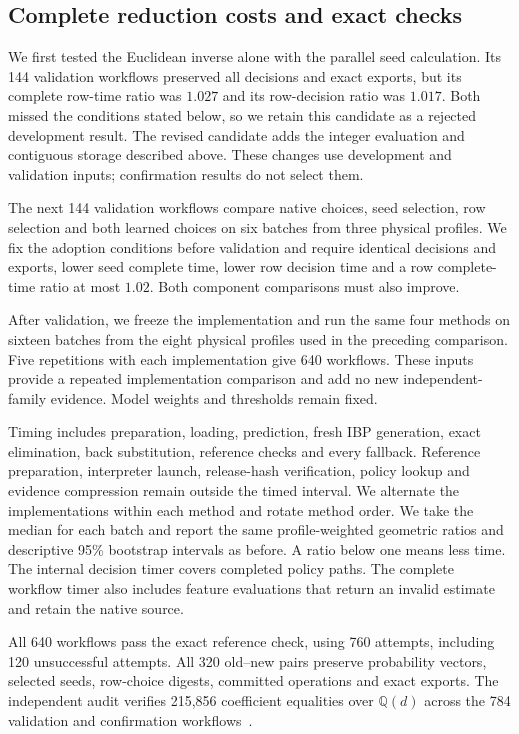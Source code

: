 \subsection{Complete reduction costs and exact checks}
We first tested the Euclidean inverse alone with the parallel seed
calculation. Its 144 validation workflows preserved all decisions and exact
exports, but its complete row-time ratio was $1.027$ and its row-decision
ratio was $1.017$. Both missed the conditions stated below, so we retain
this candidate as a rejected development result. The revised candidate
adds the integer evaluation and contiguous storage described above.
These changes use development and validation inputs; confirmation results
do not select them.

The next 144 validation workflows compare native choices, seed selection,
row selection and both learned choices on six batches from three physical
profiles. We fix the adoption conditions before validation and require
identical decisions and exports, lower seed complete time, lower row
decision time and a row complete-time ratio at most $1.02$.
Both component comparisons must also improve.

After validation, we freeze the implementation and run the same four methods
on sixteen batches from the eight physical profiles used in the preceding
comparison. Five repetitions with each implementation give 640 workflows.
These inputs provide a repeated implementation comparison and add no new
independent-family evidence. Model weights and thresholds remain fixed.

Timing includes preparation, loading, prediction, fresh IBP generation,
exact elimination, back substitution, reference checks and every fallback.
Reference preparation, interpreter launch, release-hash verification,
policy lookup and evidence
compression remain outside the timed interval. We alternate the implementations
within each method and rotate method order. We take the median for each batch
and report the same profile-weighted geometric ratios and descriptive
95\% bootstrap intervals as before. A ratio below one means less time.
The internal decision timer covers completed policy paths. The complete
workflow timer also includes feature evaluations that return an invalid
estimate and retain the native source.

All 640 workflows pass the exact reference check, using 760 attempts, including 120 unsuccessful attempts. All 320 old--new pairs preserve probability vectors, selected seeds, row-choice digests, committed operations and exact exports. The independent audit verifies 215,856 coefficient equalities over $\mathbb Q(d)$ across the 784 validation and confirmation workflows~\cite{KiraParallelInferenceData}.

